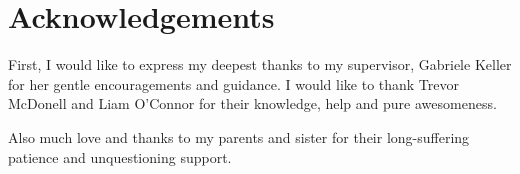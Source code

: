 \chapter*{Acknowledgements}\label{ack}

First, I would like to express my deepest thanks to my supervisor, Gabriele Keller for her gentle encouragements and guidance. I would like to thank Trevor McDonell and Liam O'Connor for their knowledge, help and pure awesomeness. 

Also much love and thanks to my parents and sister for their long-suffering patience and unquestioning support.